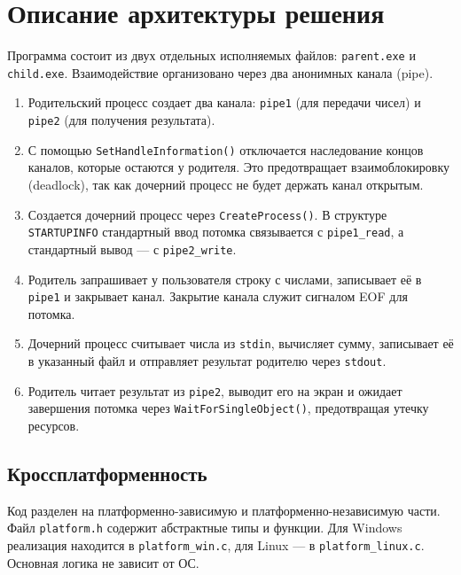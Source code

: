 \section*{Описание архитектуры решения}

Программа состоит из двух отдельных исполняемых файлов: \texttt{parent.exe} и \texttt{child.exe}. Взаимодействие организовано через два анонимных канала (pipe).

\begin{enumerate}
    \item Родительский процесс создает два канала: \texttt{pipe1} (для передачи чисел) и \texttt{pipe2} (для получения результата).
    \item С помощью \texttt{SetHandleInformation()} отключается наследование концов каналов, которые остаются у родителя. Это предотвращает взаимоблокировку (deadlock), так как дочерний процесс не будет держать канал открытым.
    \item Создается дочерний процесс через \texttt{CreateProcess()}. В структуре \texttt{STARTUPINFO} стандартный ввод потомка связывается с \texttt{pipe1\_read}, а стандартный вывод — с \texttt{pipe2\_write}.
    \item Родитель запрашивает у пользователя строку с числами, записывает её в \texttt{pipe1} и закрывает канал. Закрытие канала служит сигналом EOF для потомка.
    \item Дочерний процесс считывает числа из \texttt{stdin}, вычисляет сумму, записывает её в указанный файл и отправляет результат родителю через \texttt{stdout}.
    \item Родитель читает результат из \texttt{pipe2}, выводит его на экран и ожидает завершения потомка через \texttt{WaitForSingleObject()}, предотвращая утечку ресурсов.
\end{enumerate}

\subsection*{Кроссплатформенность}
Код разделен на платформенно-зависимую и платформенно-независимую части. Файл \texttt{platform.h} содержит абстрактные типы и функции. Для Windows реализация находится в \texttt{platform\_win.c}, для Linux — в \texttt{platform\_linux.c}. Основная логика не зависит от ОС.